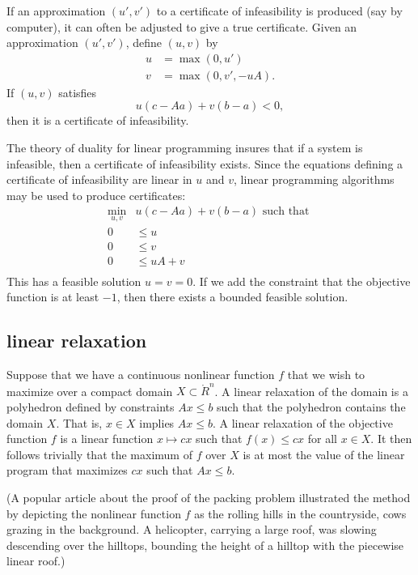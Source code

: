 If an approximation $(u',v')$ to a certificate of infeasibility is
produced (say by computer), it can often be adjusted to give a
true certificate.  Given an approximation $(u',v')$, define
$(u,v)$ by
$$
\begin{array}{lll}
u &= \max(0,u')\\
v &= \max(0,v',-u A).
\end{array}
$$
If $(u,v)$ satisfies
$$u( c-A a) + v(b-a) <0,$$
then it is a certificate of infeasibility.

The theory of duality for linear programming insures that if a
system is infeasible, then a certificate of infeasibility exists.
Since the equations defining a certificate of infeasibility are
linear in $u$ and $v$, linear programming algorithms may be used
to produce certificates:
$$
\begin{array}{rll}
\min_{u,v} &u (c-A a) + v(b-a) \text{ such that }\\
0 &\le u\\
0 &\le v \\
0& \le u A + v\\
\end{array}
$$
This has a feasible solution $u=v=0$.  If we add the constraint
that the objective function is at least $-1$, then there exists a
bounded feasible solution.


\subsection{linear relaxation}

Suppose that we have a continuous
nonlinear function $f$ that we wish to maximize
over a compact domain $X\subset \ring{R}^n$.    A linear relaxation
of the domain is a polyhedron defined by constraints $A x \le b$
such that the polyhedron contains the domain $X$.  That is,
$x\in X$ implies $A x \le b$.    A linear relaxation of the objective
function $f$ is a linear function $x\mapsto c x$ such that
$f(x) \le c x$ for all $x\in X$.  It then follows trivially
that the maximum of $f$ over $X$ is at most the value of 
the linear program that maximizes $c x$ such that $A x \le b$.

(A popular article about the proof of the packing problem
illustrated the method by depicting the nonlinear function $f$
as the rolling hills in the countryside, cows grazing in the background.  
A helicopter,
carrying a large roof, was slowing
descending over the hilltops, bounding the height of a hilltop
with the piecewise linear roof.)

